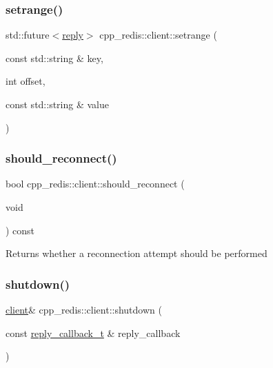 \subsubsection{\texorpdfstring{setrange()}{setrange()}\hspace{0.1cm}{\footnotesize\ttfamily [2/2]}}
{\footnotesize\ttfamily std\+::future$<$\hyperlink{classcpp__redis_1_1reply}{reply}$>$ cpp\+\_\+redis\+::client\+::setrange (\begin{DoxyParamCaption}\item[{const std\+::string \&}]{key,  }\item[{int}]{offset,  }\item[{const std\+::string \&}]{value }\end{DoxyParamCaption})}

\mbox{\label{classcpp__redis_1_1client_a62dc004b1d1e73787b8b211ecc8f77bb}} 
\subsubsection{\texorpdfstring{should\+\_\+reconnect()}{should\_reconnect()}}
{\footnotesize\ttfamily bool cpp\+\_\+redis\+::client\+::should\+\_\+reconnect (\begin{DoxyParamCaption}\item[{void}]{ }\end{DoxyParamCaption}) const\hspace{0.3cm}{\ttfamily [private]}}

\begin{DoxyReturn}{Returns}
whether a reconnection attempt should be performed 
\end{DoxyReturn}
\mbox{\label{classcpp__redis_1_1client_acdb7064ddc309b1dbc6681ae559cc189}} 
\subsubsection{\texorpdfstring{shutdown()}{shutdown()}\hspace{0.1cm}{\footnotesize\ttfamily [1/4]}}
{\footnotesize\ttfamily \hyperlink{classcpp__redis_1_1client}{client}\& cpp\+\_\+redis\+::client\+::shutdown (\begin{DoxyParamCaption}\item[{const \hyperlink{classcpp__redis_1_1client_a061a1140d36d2eaeda82b09a0bb3f9f2}{reply\+\_\+callback\+\_\+t} \&}]{reply\+\_\+callback }\end{DoxyParamCaption})}

